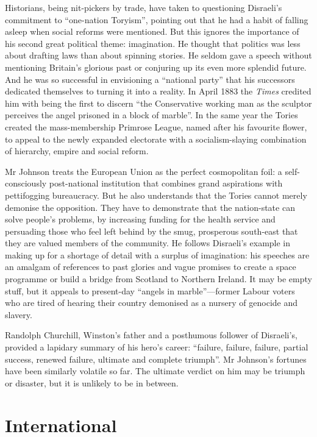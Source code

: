 \documentclass{article}
\begin{document}
Historians, being nit-pickers by trade, have taken to questioning Disraeli's commitment to ``one-nation Toryism'', pointing out that he had a habit of falling asleep when social reforms were mentioned. But this ignores the importance of his second great political theme: imagination. He thought that politics was less about drafting laws than about spinning stories. He seldom gave a speech without mentioning Britain's glorious past or conjuring up its even more splendid future. And he was so successful in envisioning a ``national party'' that his successors dedicated themselves to turning it into a reality. In April 1883 the \emph{Times} credited him with being the first to discern ``the Conservative working man as the sculptor perceives the angel prisoned in a block of marble''. In the same year the Tories created the mass-membership Primrose League, named after his favourite flower, to appeal to the newly expanded electorate with a socialism-slaying combination of hierarchy, empire and social reform. 

Mr Johnson treats the European Union as the perfect cosmopolitan foil: a self-consciously post-national institution that combines grand aspirations with pettifogging bureaucracy. But he also understands that the Tories cannot merely demonise the opposition. They have to demonstrate that the nation-state can solve people's problems, by increasing funding for the health service and persuading those who feel left behind by the smug, prosperous south-east that they are valued members of the community. He follows Disraeli's example in making up for a shortage of detail with a surplus of imagination: his speeches are an amalgam of references to past glories and vague promises to create a space programme or build a bridge from Scotland to Northern Ireland. It may be empty stuff, but it appeals to present-day ``angels in marble''---former Labour voters who are tired of hearing their country demonised as a nursery of genocide and slavery. 

Randolph Churchill, Winston's father and a posthumous follower of Disraeli's, provided a lapidary summary of his hero's career: ``failure, failure, failure, partial success, renewed failure, ultimate and complete triumph''. Mr Johnson's fortunes have been similarly volatile so far. The ultimate verdict on him may be triumph or disaster, but it is unlikely to be in between.{} 
\clearpage
\section{International }
\end{document}
